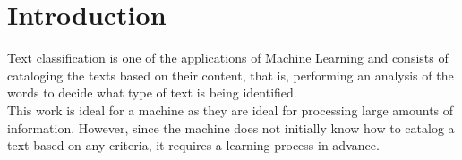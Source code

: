 \documentclass[sigconf,12pt,review=false,natbib=false]{acmart}
\begin{document}
\maketitle

\section{Introduction}

Text classification is one of the applications of Machine Learning and consists of cataloging the
texts based on their content, that is, performing an analysis of the words to decide what type of
text is being identified. \\

This work is ideal for a machine as they are ideal for processing large amounts of information.
However, since the machine does not initially know how to catalog a text based on any criteria, it
requires a learning process in advance. \\

\nocite{*}
\printbibliography
\end{document}
